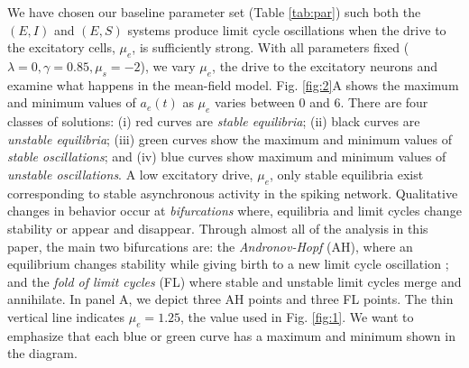 \documentclass[10pt,letterpaper]{article}
\begin{document}
We have chosen our baseline parameter set (Table \ref{tab:par}) such both the $(E,I)$ and $(E,S)$ systems produce limit cycle oscillations when the drive to the excitatory cells, $\mu_e$, is sufficiently strong.  With all parameters fixed ($\lambda=0,\gamma=0.85,\mu_s=-2$), we vary $\mu_e$, the drive to the excitatory neurons and examine what happens in the mean-field model.  Fig. \ref{fig:2}A shows the maximum and minimum values of $a_e(t)$ as $\mu_e$ varies between 0 and 6. There are four classes of solutions: (i) red curves are {\em stable equilibria}; (ii) black curves are {\em unstable equilibria}; (iii) green curves show the maximum and minimum values of {\em stable oscillations}; and (iv) blue curves show maximum and minimum values of {\em unstable oscillations}.  A low excitatory drive, $\mu_e$, only stable equilibria exist corresponding to stable asynchronous activity in the spiking network. Qualitative changes in behavior occur at {\em bifurcations} where, equilibria and limit cycles change stability or appear and disappear. Through almost all of the analysis in this paper, the main two bifurcations are: the {\em Andronov-Hopf} (AH), where an equilibrium changes stability while giving birth to a new limit cycle oscillation ; and the {\em fold of limit cycles} (FL) where stable and unstable limit cycles merge and annihilate.  In panel A, we depict three AH points and three FL points.  The thin vertical line indicates $\mu_e=1.25$, the value used in Fig. \ref{fig:1}. We want to emphasize that each blue or green curve has a maximum and minimum shown in the diagram. 
\end{document}
